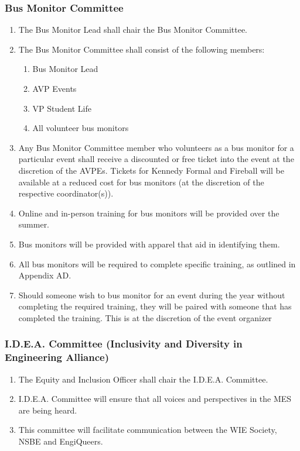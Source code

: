 \subsubsection{Bus Monitor Committee}
\label{bus-monitor-committee}
\begin{enumerate}
 \item
  The Bus Monitor Lead shall chair the Bus Monitor Committee.
 \item
  The Bus Monitor Committee shall consist of the following members:

  \begin{enumerate}
   \item
    Bus Monitor Lead
   \item
    AVP Events
   \item
    VP Student Life
   \item
    All volunteer bus monitors
  \end{enumerate}
 \item
  Any Bus Monitor Committee member who volunteers as a bus monitor for a particular event shall receive a discounted or free ticket into the event at the discretion of the AVPEs.\hspace{0pt} \hspace{0pt}Tickets for Kennedy Formal and Fireball will be available at a reduced cost for bus monitors (at the discretion of the respective coordinator(s)).
 \item
  Online and in-person training for bus monitors will be provided over the summer.
 \item
  Bus monitors will be provided with apparel that aid in identifying them.
 \item
  \hspace{0pt}All bus monitors will be required to complete specific
  training, as outlined in Appendix AD.
 \item
  Should someone wish to bus monitor for an event during the year without completing the required training, they will be paired with someone that has completed the training. This is at the discretion of the event organizer

\end{enumerate}

\subsubsection{I.D.E.A. Committee (Inclusivity and Diversity in Engineering Alliance)}
\label{i.d.e.a.-committee-inclusivity-and-diversity-in-engineering-alliance}
\begin{enumerate}
 \item
  The Equity and Inclusion Officer shall chair the I.D.E.A. Committee.
 \item
  I.D.E.A. Committee will ensure that all voices and perspectives in the MES are being heard.
 \item
  This committee will facilitate communication between the WIE Society, NSBE and EngiQueers.
\end{enumerate}

